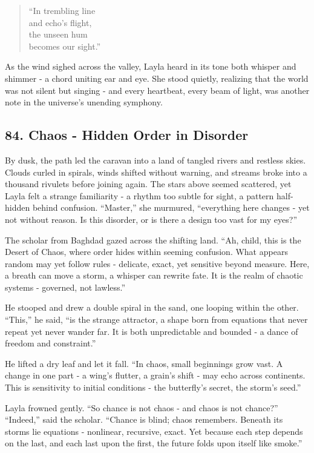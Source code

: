 \documentclass[
  letterpaper,
  DIV=11,
  numbers=noendperiod]{scrreprt}
\begin{document}
\begin{quote}
``In trembling line\\
and echo's flight,\\
the unseen hum\\
becomes our sight.''
\end{quote}

As the wind sighed across the valley, Layla heard in its tone both
whisper and shimmer - a chord uniting ear and eye. She stood quietly,
realizing that the world was not silent but singing - and every
heartbeat, every beam of light, was another note in the universe's
unending symphony.

\subsection{84. Chaos - Hidden Order in
Disorder}\label{chaos---hidden-order-in-disorder}

By dusk, the path led the caravan into a land of tangled rivers and
restless skies. Clouds curled in spirals, winds shifted without warning,
and streams broke into a thousand rivulets before joining again. The
stars above seemed scattered, yet Layla felt a strange familiarity - a
rhythm too subtle for sight, a pattern half-hidden behind confusion.
``Master,'' she murmured, ``everything here changes - yet not without
reason. Is this disorder, or is there a design too vast for my eyes?''

The scholar from Baghdad gazed across the shifting land. ``Ah, child,
this is the Desert of Chaos, where order hides within seeming confusion.
What appears random may yet follow rules - delicate, exact, yet
sensitive beyond measure. Here, a breath can move a storm, a whisper can
rewrite fate. It is the realm of chaotic systems - governed, not
lawless.''

He stooped and drew a double spiral in the sand, one looping within the
other. ``This,'' he said, ``is the strange attractor, a shape born from
equations that never repeat yet never wander far. It is both
unpredictable and bounded - a dance of freedom and constraint.''

He lifted a dry leaf and let it fall. ``In chaos, small beginnings grow
vast. A change in one part - a wing's flutter, a grain's shift - may
echo across continents. This is sensitivity to initial conditions - the
butterfly's secret, the storm's seed.''

Layla frowned gently. ``So chance is not chaos - and chaos is not
chance?'' ``Indeed,'' said the scholar. ``Chance is blind; chaos
remembers. Beneath its storms lie equations - nonlinear, recursive,
exact. Yet because each step depends on the last, and each last upon the
first, the future folds upon itself like smoke.''
\end{document}
